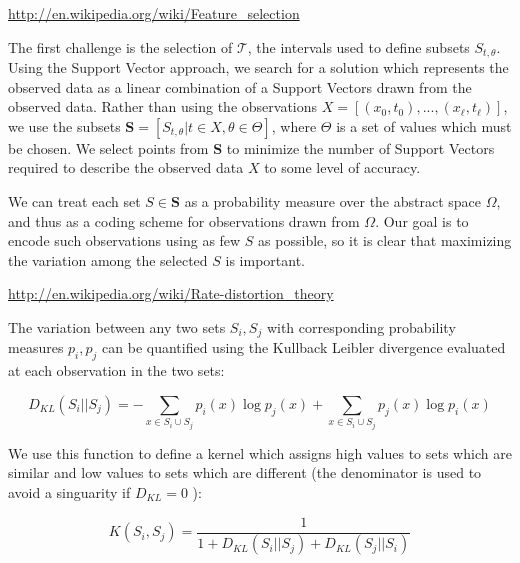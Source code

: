\documentclass[10pt]{article}
\begin{document}
\url{http://en.wikipedia.org/wiki/Feature_selection}

The first challenge is the selection of \( \mathcal{T} \), the intervals used to define subsets \( S_{t,\theta} \).  Using the Support Vector approach, we search for a solution which represents the observed data as a linear combination of a Support Vectors drawn from the observed data.  Rather than using the observations \( X = [ (x_0,t_0),...,(x_\ell,t_\ell) ] \), we use the subsets \( \mathbf{S} = [ S_{t,\theta} | t \in X, \theta \in \Theta ] \), where \( \Theta \) is a set of values which must be chosen.  We select points from \( \mathbf{S} \) to minimize the number of Support Vectors required to describe the observed data \( X \) to some level of accuracy.

We can treat each set \( S \in \mathbf{S} \) as a probability measure over the abstract space \( \Omega \), and thus as a coding scheme for observations drawn from \( \Omega \).  Our goal is to encode such observations using as few \( S \) as possible, so it is clear that maximizing the variation among the selected \( S \) is important.  

\url{http://en.wikipedia.org/wiki/Rate-distortion_theory}


The variation between any two sets \( S_i, S_j \) with corresponding probability measures \( p_i, p_j \) can be quantified using the Kullback Leibler divergence evaluated at each observation in the two sets:

\begin{equation}
D_{KL}(S_i||S_j) = -\sum_{x \in S_i \cup S_j} p_i(x) \log p_j(x) + \sum_{x \in S_i \cup S_j} p_j(x) \log p_i(x)
\end{equation}

We use this function to define a kernel which assigns high values to sets which are similar and low values to sets which are different (the denominator is used to avoid a singuarity if \( D_{KL} = 0 \) ):

\begin{equation}
K(S_i,S_j) = \frac{1}{1+ D_{KL}( S_i || S_j ) + D_{KL}( S_j || S_i )}
\end{equation}
\end{document}
